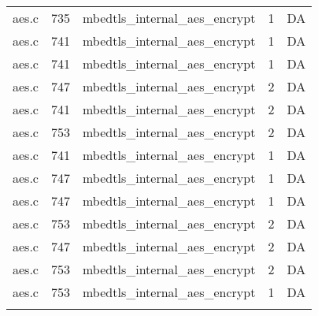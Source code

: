 \begin{table}[h]
{\begin{tabular}{clrrr}
aes.c&735&mbedtls\_internal\_aes\_encrypt&1 &DA\\
aes.c&741&mbedtls\_internal\_aes\_encrypt&1 &DA\\
aes.c&741&mbedtls\_internal\_aes\_encrypt&1 &DA\\
aes.c&747&mbedtls\_internal\_aes\_encrypt&2 &DA\\
aes.c&741&mbedtls\_internal\_aes\_encrypt&2 &DA\\
aes.c&753&mbedtls\_internal\_aes\_encrypt&2 &DA\\
aes.c&741&mbedtls\_internal\_aes\_encrypt&1 &DA\\
aes.c&747&mbedtls\_internal\_aes\_encrypt&1 &DA\\
aes.c&747&mbedtls\_internal\_aes\_encrypt&1 &DA\\
aes.c&753&mbedtls\_internal\_aes\_encrypt&2 &DA\\
aes.c&747&mbedtls\_internal\_aes\_encrypt&2 &DA\\
aes.c&753&mbedtls\_internal\_aes\_encrypt&2 &DA\\
aes.c&753&mbedtls\_internal\_aes\_encrypt&1 &DA\\
&&&&\\
\hline
\end{tabular}
}
\end{table}